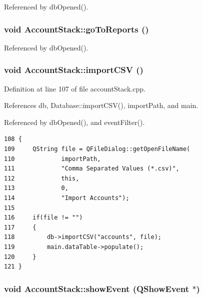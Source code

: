 Referenced by db\-Opened().\hypertarget{classAccountStack_l2}{
\subsubsection[goToReports]{\setlength{\rightskip}{0pt plus 5cm}void Account\-Stack::go\-To\-Reports ()}}
\label{classAccountStack_l2}




Referenced by db\-Opened().\hypertarget{classAccountStack_k1}{
\subsubsection[importCSV]{\setlength{\rightskip}{0pt plus 5cm}void Account\-Stack::import\-CSV ()}}
\label{classAccountStack_k1}


Definition at line 107 of file account\-Stack.cpp.

References db, Database::import\-CSV(), import\-Path, and main.

Referenced by db\-Opened(), and event\-Filter().

\footnotesize\begin{verbatim}108 {
109     QString file = QFileDialog::getOpenFileName(
110             importPath,
111             "Comma Separated Values (*.csv)",
112             this,
113             0,
114             "Import Accounts");
115     
116     if(file != "")
117     {
118         db->importCSV("accounts", file);
119         main.dataTable->populate();
120     }
121 }
\end{verbatim}\normalsize 


\hypertarget{classAccountStack_d1}{
\subsubsection[showEvent]{\setlength{\rightskip}{0pt plus 5cm}void Account\-Stack::show\-Event (QShow\-Event $\ast$)}}
\label{classAccountStack_d1}


